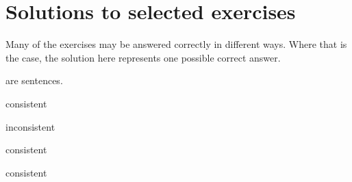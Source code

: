 \chapter[Solutions to selected exercises]{Solutions to selected exercises}
\label{app.solutions}

Many of the exercises may be answered correctly in different ways. Where that is the case, the solution here represents one possible correct answer.

\nextSeq
\nextSeq
\noSeq
\nextSeq
\nextSeq
\nextSeq
\noSeq
\nextSeq
\noSeq
\lastSeq are sentences.

\begin{earg}
\item consistent
\item inconsistent
\item consistent
\item consistent
\end{earg}

